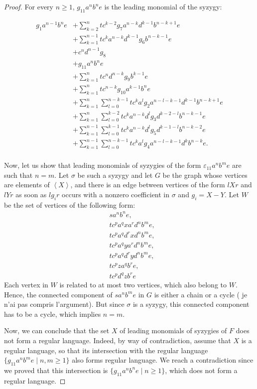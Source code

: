 \documentclass[sigconf]{acmart}
\theoremstyle{plain}
\theoremstyle{definition}
\theoremstyle{remark}
\newcommand\fixmecc[1]{{\color{red}{\underline{\bf C:}} #1}}
\begin{document}
\begin{proof}
  For every $n \geq 1$, $g_{11}a^nb^ne$ is the leading monomial of the syzygy:

  \begin{align*}
    g_1a^{n-1}b^ne & + \sum_{k = 2}^{n} tc^{k - 2}g_7a^{n - k}d^{k - 1}b^{n - k + 1}e \\
    & + \sum_{k = 1}^{n - 1} tc^ka^{n - k}d^{k - 1}g_6b^{n - k - 1}e \\
    & + c^nd^{n - 1}g_8 \\
    & + g_{11}a^nb^ne \\
    & + \sum_{k = 1}^n tc^nd^{n - k}g_9b^{k - 1}e \\
    & + \sum_{k = 1}^n tc^{n - k}g_{10}a^{k - 1}b^ne \\
    & + \sum_{k = 1}^{n} \sum_{l = 0}^{n - k - 1} tc^{k}a^{l}g_2a^{n - l - k - 1}d^{k - 1}b^{n - k + 1} e \\
    & + \sum_{k = 1}^{n} \sum_{l = 0}^{k - 2} tc^{k}a^{n - k}d^lg_3d^{k - 2 - l}b^{n - k - 1}e \\
    & + \sum_{k = 1}^{n - 1} \sum_{l = 0}^{k - 1} tc^{k}a^{n - k}d^lg_5d^{k - 1 - l}b^{n - k - 2}e \\
    & + \sum_{k = 1}^{n - 1} \sum_{l = 0}^{n - k - 1} tc^{k}a^{l}g_4a^{n - l - k - 1}d^{k}b^{n - k} e. \\
  \end{align*}

  Now, let us show that leading monomials of syzygies of the form $\varepsilon_{11}a^nb^me$ are such that $n = m$.
  Let $\sigma$ be such a syzygy and let $G$ be the graph whose vertices are elements of $\left\langle X \right\rangle$, and there is an edge between vertices of the form $lXr$ and $lYr$ as soon as $lg_ir$ occurs with a nonzero coefficient in $\sigma$ and $g_i=X - Y$. Let $W$ be the set of vertices of the following form:
  \begin{align*}
    & sa^nb^ne, \\
    & tc^pa^qxa^rd^nb^me, \\
    & tc^pa^qd^rxd^nb^me, \\
    & tc^pa^qya^rd^nb^me, \\
    & tc^pa^qd^ryd^nb^me, \\
    & tc^pza^qb^re, \\
    & tc^pd^qzb^re
  \end{align*}
  Each vertex in $W$ is related to at most two vertices, which also belong to $W$.
  Hence, the connected component of $sa^nb^me$ in $G$ is either a chain or a cycle (\fixmecc{je n'ai pas compris l'argument}).
  But since $\sigma$ is a syzygy, this connected component has to be a cycle, which implies $n = m$.

  Now, we can conclude that the set $X$ of leading monomials of syzygies of $F$ does not form a regular language.
  Indeed, by way of contradiction, assume that $X$ is a regular language, so that its
  intersection with the regular language $\{g_{11}a^nb^me \;|\; n, m \geq 1\}$ also forms regular language.
  We reach a contradiction since we proved that this intersection is $\{g_{11}a^nb^ne \;|\; n \geq 1 \}$, which does not form a regular language.
\end{proof}
\end{document}
